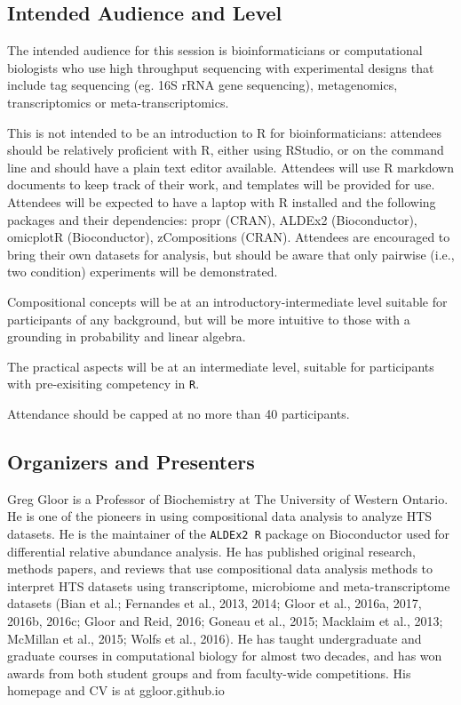 \documentclass[twocolumn]{article}
\begin{document}
\hypertarget{intended-audience-and-level}{%
\subsection{Intended Audience and
Level}\label{intended-audience-and-level}}

The intended audience for this session is bioinformaticians or
computational biologists who use high throughput sequencing with
experimental designs that include tag sequencing (eg. 16S rRNA gene
sequencing), metagenomics, transcriptomics or meta-transcriptomics.

This is not intended to be an introduction to R for bioinformaticians:
attendees should be relatively proficient with R, either using RStudio,
or on the command line and should have a plain text editor available.
Attendees will use R markdown documents to keep track of their work, and
templates will be provided for use. Attendees will be expected to have a
laptop with R installed and the following packages and their
dependencies: propr (CRAN), ALDEx2 (Bioconductor), omicplotR
(Bioconductor), zCompositions (CRAN). Attendees are encouraged to bring
their own datasets for analysis, but should be aware that only pairwise
(i.e., two condition) experiments will be demonstrated.

Compositional concepts will be at an introductory-intermediate level
suitable for participants of any background, but will be more intuitive
to those with a grounding in probability and linear algebra.

The practical aspects will be at an intermediate level, suitable for
participants with pre-exisiting competency in \texttt{R}.

Attendance should be capped at no more than 40 participants.

\hypertarget{organizers-and-presenters}{%
\subsection{Organizers and Presenters}\label{organizers-and-presenters}}

Greg Gloor is a Professor of Biochemistry at The University of Western
Ontario. He is one of the pioneers in using compositional data analysis
to analyze HTS datasets. He is the maintainer of the \texttt{ALDEx2\ R}
package on Bioconductor used for differential relative abundance
analysis. He has published original research, methods papers, and
reviews that use compositional data analysis methods to interpret HTS
datasets using transcriptome, microbiome and meta-transcriptome datasets
(Bian et al.; Fernandes et al., 2013, 2014; Gloor et al., 2016a, 2017,
2016b, 2016c; Gloor and Reid, 2016; Goneau et al., 2015; Macklaim et
al., 2013; McMillan et al., 2015; Wolfs et al., 2016). He has taught
undergraduate and graduate courses in computational biology for almost
two decades, and has won awards from both student groups and from
faculty-wide competitions. His homepage and CV is at ggloor.github.io
\end{document}
